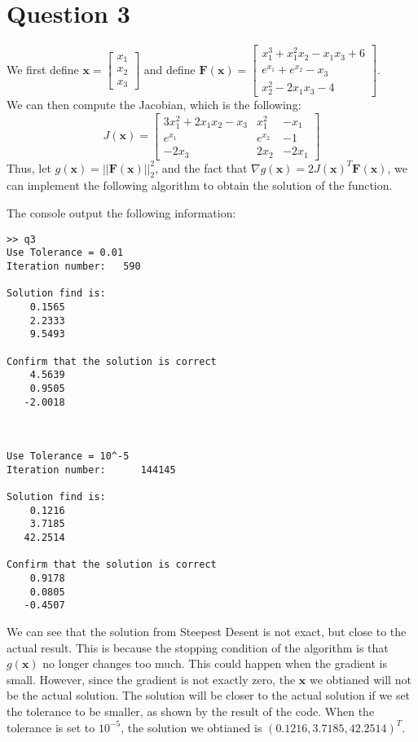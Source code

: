 \documentclass[11pt]{article}
\begin{document}
\section*{Question 3}
We first define $\mathbf{x} = \begin{bmatrix}
x_1\\x_2\\x_3
\end{bmatrix}$ and define $ \mathbf{F}(\mathbf{x}) = \begin{bmatrix}
x_1^3 + x_1^2x_2 - x_1x_3 + 6\\
e^{x_1} + e^{x_2} - x_3\\
x_2^2 - 2x_1x_3 - 4
\end{bmatrix}$.\\
We can then compute the Jacobian, which is the following:
\[ J(\mathbf{x}) = \begin{bmatrix}
3x_1^2 + 2x_1x_2 - x_3 & x_1^2 & -x_1\\
e^{x_1} & e^{x_2} & -1\\
-2x_3 & 2x_2 & -2x_1
\end{bmatrix} \]
Thus, let $g(\mathbf{x}) = ||\mathbf{F}(\mathbf{x})||_2^2$, and the fact that $\nabla g(\mathbf{x}) = 2J(\mathbf{x})^T\mathbf{F}(\mathbf{x})$, we can implement the following algorithm to obtain the solution of the function.

The console output the following information:
\begin{verbatim}
>> q3
Use Tolerance = 0.01
Iteration number:   590

Solution find is:
    0.1565
    2.2333
    9.5493

Confirm that the solution is correct
    4.5639
    0.9505
   -2.0018



Use Tolerance = 10^-5
Iteration number:      144145

Solution find is:
    0.1216
    3.7185
   42.2514

Confirm that the solution is correct
    0.9178
    0.0805
   -0.4507
\end{verbatim}
We can see that the solution from Steepest Desent is not exact, but close to the actual result. This is because the stopping condition of the algorithm is that $g(\mathbf{x})$ no longer changes too much. This could happen when the gradient is small. However, since the gradient is not exactly zero, the $\mathbf{x}$ we obtianed will not be the actual solution. The solution will be closer to the actual solution if we set the tolerance to be smaller, as shown by the result of the code. When the tolerance is set to $10^{-5}$, the solution we obtianed is $(0.1216,3.7185,42.2514)^T$.
\end{document}
